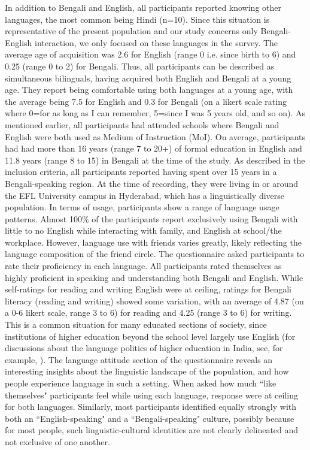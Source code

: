 \documentclass[12 pt]{article}
\begin{document}
In addition to Bengali and English, all participants reported knowing other languages, the most common being Hindi (n=10). Since this situation is representative of the present population and our study concerns only Bengali-English interaction, we only focused on these languages in the survey.
The average age of acquisition was 2.6 for English (range 0 i.e. since birth to 6) and 0.25 (range 0 to 2) for Bengali. Thus, all participants can be described as simultaneous bilinguals, having acquired both English and Bengali at a young age. They report being comfortable using both languages at a young age, with the average being 7.5 for English and 0.3 for Bengali (on a likert scale rating where 0=for as long as I can remember, 5=since I was 5 years old, and so on). As mentioned earlier, all participants had attended schools where Bengali and English were both used as Medium of Instruction (MoI). On average, participants had had more than 16 years (range 7 to 20+) of formal education in English and 11.8 years (range 8 to 15) in Bengali at the time of the study. As described in the inclusion criteria, all participants reported having spent over 15 years in a Bengali-speaking region. At the time of recording, they were living in or around the EFL University campus in Hyderabad, which has a linguistically diverse population. In terms of usage, participants show a range of language usage patterns. Almost 100\% of the participants report exclusively using Bengali with little to no English while interacting with family, and English at school/the workplace. However, language use with friends varies greatly, likely reflecting the language composition of the friend circle. 
The questionnaire asked participants to rate their proficiency in each language. All participants rated themselves as highly proficient in speaking and understanding both Bengali and English. While self-ratings for reading and writing English were at ceiling, ratings for Bengali literacy (reading and writing) showed some variation, with an average of 4.87 (on a 0-6 likert scale, range 3 to 6) for reading and 4.25 (range 3 to 6) for writing. This is a common situation for many educated sections of society, since institutions of higher education beyond the school level largely use English (for discussions about the language politics of higher education in India, see, for example, \cite{mohanty2009multilingual}). 
The language attitude section of the questionnaire reveals an interesting insights about the linguistic landscape of the population, and how people experience language in such a setting. When asked how much ``like themselves" participants feel while using each language, response were at ceiling for both languages. Similarly, most participants identified equally strongly with both an ``English-speaking" and a ``Bengali-speaking" culture, possibly because for most people, such linguistic-cultural identities are not clearly delineated and not exclusive of one another. 
\end{document}
